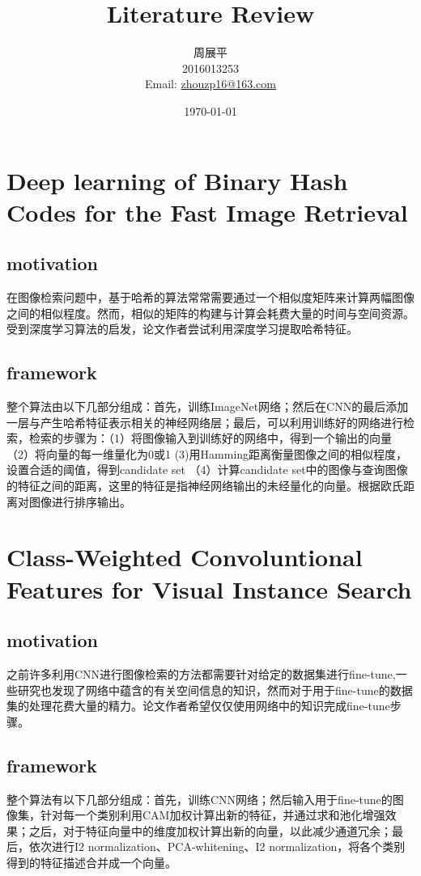 \documentclass[12pt]{article}
\title{Literature Review}
\author{周展平\\2016013253\\Email: \href{mailto:zhouzp16@163.com}{zhouzp16@163.com}}
\date{\today}
\begin{document}
	\maketitle
	\section{Deep learning of Binary Hash Codes for the Fast Image Retrieval}
		\subsection{motivation}
			在图像检索问题中，基于哈希的算法常常需要通过一个相似度矩阵来计算两幅图像之间的相似程度。然而，相似的矩阵的构建与计算会耗费大量的时间与空间资源。受到深度学习算法的启发，论文作者尝试利用深度学习提取哈希特征。
		\subsection{framework}
			整个算法由以下几部分组成：首先，训练ImageNet网络；然后在CNN的最后添加一层与产生哈希特征表示相关的神经网络层；最后，可以利用训练好的网络进行检索，检索的步骤为：（1）将图像输入到训练好的网络中，得到一个输出的向量 （2）将向量的每一维量化为0或1 (3)用Hamming距离衡量图像之间的相似程度，设置合适的阈值，得到candidate set （4）计算candidate set中的图像与查询图像的特征之间的距离，这里的特征是指神经网络输出的未经量化的向量。根据欧氏距离对图像进行排序输出。

	\section{Class-Weighted Convoluntional Features for Visual Instance Search}
		\subsection{motivation}
			之前许多利用CNN进行图像检索的方法都需要针对给定的数据集进行fine-tune,一些研究也发现了网络中蕴含的有关空间信息的知识，然而对于用于fine-tune的数据集的处理花费大量的精力。论文作者希望仅仅使用网络中的知识完成fine-tune步骤。
		\subsection{framework}
			整个算法有以下几部分组成：首先，训练CNN网络；然后输入用于fine-tune的图像集，针对每一个类别利用CAM加权计算出新的特征，并通过求和池化增强效果；之后，对于特征向量中的维度加权计算出新的向量，以此减少通道冗余；最后，依次进行I2 normalization、PCA-whitening、I2 normalization，将各个类别得到的特征描述合并成一个向量。
\end{document}
